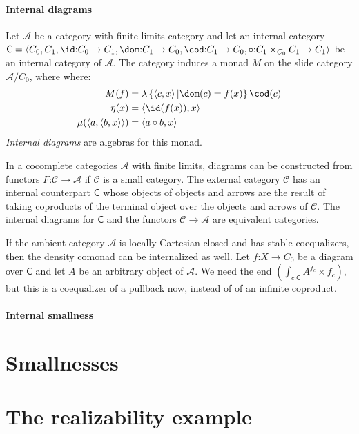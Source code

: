 \documentclass{tac}
\newcommand\hide[1]{}
\newcommand\cat\mathcal
\newcommand\icat\mathsf
\newcommand\of{\mathord:}
\newcommand\set[1]{\left\{#1\right\}}
\newcommand\tuplet[1]{\left\langle #1 \right\rangle}
\begin{document}
\paragraph{Internal diagrams}
\begin{definition} Let $\cat A$ be a category with finite limits category and let an internal category $\icat C = \tuplet{C_0,C_1,\id\of C_0\to C_1,\dom\of C_1\to C_0,\cod\of C_1\to C_0,\circ\of C_1\times_{C_0}C_1\to C_1}$ be an internal category of $\cat A$. 
The category induces a monad $M$ on the slide category $\cat A/C_0$, where where:
\begin{align*}
M(f) &= \lambda\set{\tuplet{c,x}| \dom(c)=f(x)}\cod(c) \\
\eta(x) &= \tuplet{\id(f(x)),x}\\
\mu(\tuplet{a,\tuplet{b,x}}) &= \tuplet{a\circ b,x}
\end{align*}
\emph{Internal diagrams} are algebras for this monad.
\end{definition}

\begin{example}
In a cocomplete categories $\cat A$ with finite limits, diagrams can be constructed from functors $F\of\cat C\to\cat A$ if $\cat C$ is a small category. The external category $\cat C$ has an internal counterpart $\icat C$ whose objects of objects and arrows are the result of taking coproducts of the terminal object over the objects and arrows of $\cat C$. The internal diagrams for $\icat C$ and the functors $\cat C\to \cat A$ are equivalent categories.
\end{example}

If the ambient category $\cat A$ is locally Cartesian closed and has stable coequalizers, then the density comonad can be internalized as well. Let $f\of X\to C_0$ be a diagram over $\icat C$ and let $A$ be an arbitrary object of $\cat A$. We need the end $\left(\int_{c\of \icat C}A^{f_c}\times f_c\right)$, but this is a coequalizer of a pullback now, instead of of an infinite coproduct.

\paragraph{Internal smallness}

\hide{
collect requirements:
- lccc for the internalized density comonads
- pushouts
- internalized smallness
}

\section{Smallnesses}
\hide{
- nno's cycles & horns
- W-types
-	etc.
}
\section{The realizability example}
\hide{
- simplicial assemblies & modest sets.
- exact completions for pushouts.
- exact completions as examples of homotopy categories.
}
\end{document}
